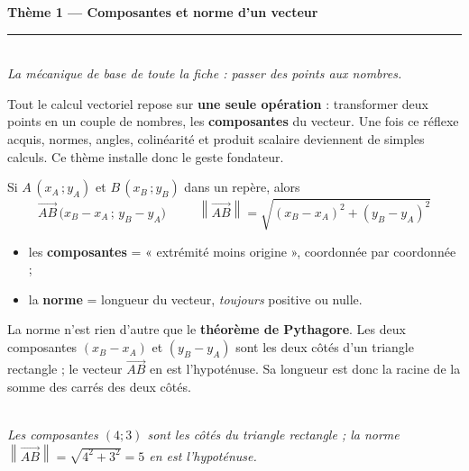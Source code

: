 \documentclass[11pt,a4paper]{article}
\newcommand{\vc}[1]{\overrightarrow{#1}}
\providecommand{\norm}[1]{\left\lVert #1\right\rVert}
\begin{document}
\begin{center}
{\LARGE\bfseries\color{primarydark}Thème 1 — Composantes et norme d'un vecteur}\\[2pt]
{\color{primary}\rule{0.55\linewidth}{1.2pt}}\\[4pt]
{\small\itshape La mécanique de base de toute la fiche : passer des \emph{points} aux \emph{nombres}.}
\end{center}

\vspace{2mm}

Tout le calcul vectoriel repose sur \textbf{une seule opération} : transformer deux points en un couple de
nombres, les \textbf{composantes} du vecteur. Une fois ce réflexe acquis, normes, angles, colinéarité et
produit scalaire deviennent de simples calculs. Ce thème installe donc le geste fondateur.

\begin{rappel}
Si $A\,(x_A\,;y_A)$ et $B\,(x_B\,;y_B)$ dans un repère, alors
\[
  \boxed{\;\vc{AB}\,\bigl(x_B-x_A\,;\,y_B-y_A\bigr)\;}
  \qquad
  \boxed{\;\norm{\vc{AB}}=\sqrt{(x_B-x_A)^2+(y_B-y_A)^2}\;}
\]
\begin{itemize}[leftmargin=1.5em,topsep=2pt,itemsep=1pt]
  \item les \textbf{composantes} = « extrémité moins origine », coordonnée par coordonnée ;
  \item la \textbf{norme} = longueur du vecteur, \emph{toujours} positive ou nulle.
\end{itemize}
\end{rappel}

\begin{idee}
La norme n'est rien d'autre que le \textbf{théorème de Pythagore}. Les deux composantes
$(x_B-x_A)$ et $(y_B-y_A)$ sont les deux côtés d'un triangle rectangle ; le vecteur $\vc{AB}$ en est
l'hypoténuse. Sa longueur est donc la racine de la somme des carrés des deux côtés.
\end{idee}

\begin{center}
\\[2pt]
{\footnotesize\itshape Les composantes $(4;3)$ sont les côtés du triangle rectangle ; la norme
$\norm{\vc{AB}}=\sqrt{4^2+3^2}=5$ en est l'hypoténuse.}
\end{center}
\end{document}
